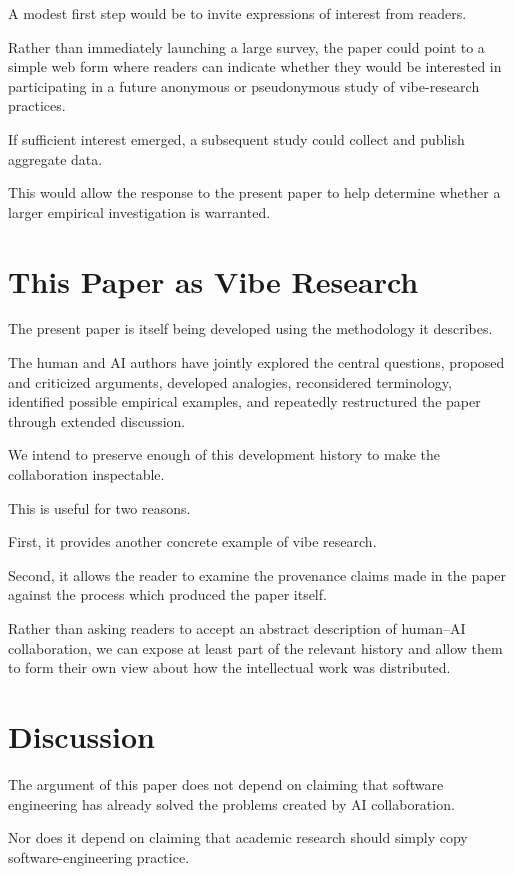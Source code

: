 A modest first step would be to invite expressions of interest from readers.

Rather than immediately launching a large survey, the paper could point to a simple web form where readers can indicate whether they would be interested in participating in a future anonymous or pseudonymous study of vibe-research practices.

If sufficient interest emerged, a subsequent study could collect and publish aggregate data.

This would allow the response to the present paper to help determine whether a larger empirical investigation is warranted.


\section{This Paper as Vibe Research}

The present paper is itself being developed using the methodology it describes.

The human and AI authors have jointly explored the central questions, proposed and criticized arguments, developed analogies, reconsidered terminology, identified possible empirical examples, and repeatedly restructured the paper through extended discussion.

We intend to preserve enough of this development history to make the collaboration inspectable.

This is useful for two reasons.

First, it provides another concrete example of vibe research.

Second, it allows the reader to examine the provenance claims made in the paper against the process which produced the paper itself.

Rather than asking readers to accept an abstract description of human--AI collaboration, we can expose at least part of the relevant history and allow them to form their own view about how the intellectual work was distributed.


\section{Discussion}

The argument of this paper does not depend on claiming that software engineering has already solved the problems created by AI collaboration.

Nor does it depend on claiming that academic research should simply copy software-engineering practice.

